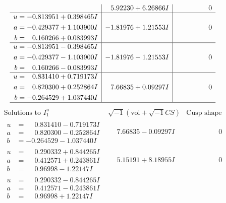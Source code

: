 \documentclass[1p]{elsarticle_modified}
\theoremstyle{definition}
\newcommand{\I}{\sqrt{-1}}
\begin{document}
$$\begin{array}{c|c|c}
 & \phantom{-}5.92230 + 6.26866 I & \phantom{-0.000000 } 0 \\ \hline\begin{aligned}
u &= -0.813951 + 0.398465 I \\
a &= -0.429377 + 1.103900 I \\
b &= \phantom{-}0.160266 + 0.083993 I\end{aligned}
 & -1.81976 + 1.21553 I & \phantom{-0.000000 } 0 \\ \hline\begin{aligned}
u &= -0.813951 - 0.398465 I \\
a &= -0.429377 - 1.103900 I \\
b &= \phantom{-}0.160266 - 0.083993 I\end{aligned}
 & -1.81976 - 1.21553 I & \phantom{-0.000000 } 0 \\ \hline\begin{aligned}
u &= \phantom{-}0.831410 + 0.719173 I \\
a &= \phantom{-}0.820300 + 0.252864 I \\
b &= -0.264529 + 1.037440 I\end{aligned}
 & \phantom{-}7.66835 + 0.09297 I & \phantom{-0.000000 } 0\\
 \hline 
 \end{array}$$\newpage$$\begin{array}{c|c|c}  
\text{Solutions to }I^u_{1}& \I (\text{vol} + \sqrt{-1}CS) & \text{Cusp shape}\\
 \hline 
\begin{aligned}
u &= \phantom{-}0.831410 - 0.719173 I \\
a &= \phantom{-}0.820300 - 0.252864 I \\
b &= -0.264529 - 1.037440 I\end{aligned}
 & \phantom{-}7.66835 - 0.09297 I & \phantom{-0.000000 } 0 \\ \hline\begin{aligned}
u &= \phantom{-}0.290332 + 0.844265 I \\
a &= \phantom{-}0.412571 + 0.243861 I \\
b &= \phantom{-}0.96998 - 1.22147 I\end{aligned}
 & \phantom{-}5.15191 + 8.18955 I & \phantom{-0.000000 } 0 \\ \hline\begin{aligned}
u &= \phantom{-}0.290332 - 0.844265 I \\
a &= \phantom{-}0.412571 - 0.243861 I \\
b &= \phantom{-}0.96998 + 1.22147 I\end{aligned}

\end{array}$$
\end{document}
